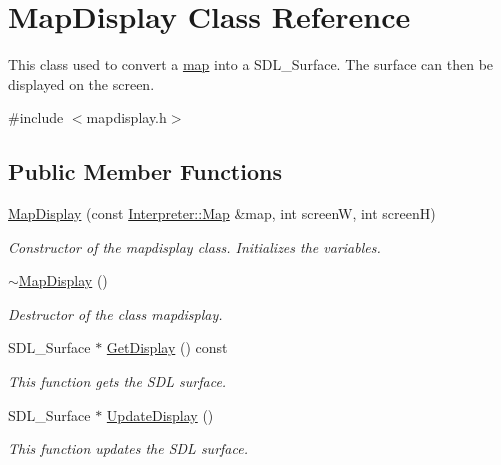 \hypertarget{classMapDisplay}{
\section{MapDisplay Class Reference}
\label{classMapDisplay}
}


This class used to convert a \hyperlink{classInterpreter_a4c080f069f557cf92dfe803117a6ea53}{map} into a SDL\_\-Surface. The surface can then be displayed on the screen.  




{\ttfamily \#include $<$mapdisplay.h$>$}

\subsection*{Public Member Functions}
\begin{DoxyCompactItemize}
\item 
\hyperlink{classMapDisplay_a3af0dfed1bf4e41a1fe810271593729d}{MapDisplay} (const \hyperlink{classMatrix}{Interpreter::Map} \&map, int screenW, int screenH)
\begin{DoxyCompactList}\small\item\em Constructor of the mapdisplay class. Initializes the variables. \item\end{DoxyCompactList}\item 
\hyperlink{classMapDisplay_a95dc44c5a18970df2131eeb10b59cd21}{$\sim$MapDisplay} ()
\begin{DoxyCompactList}\small\item\em Destructor of the class mapdisplay. \item\end{DoxyCompactList}\item 
SDL\_\-Surface $\ast$ \hyperlink{classMapDisplay_a346dbbf98f1ab76cddab55dfb9c07b27}{GetDisplay} () const 
\begin{DoxyCompactList}\small\item\em This function gets the SDL surface. \item\end{DoxyCompactList}\item 
SDL\_\-Surface $\ast$ \hyperlink{classMapDisplay_a1f8666a47c77fe1294af449e746430dc}{UpdateDisplay} ()
\begin{DoxyCompactList}\small\item\em This function updates the SDL surface. \item\end{DoxyCompactList}\end{DoxyCompactItemize}

